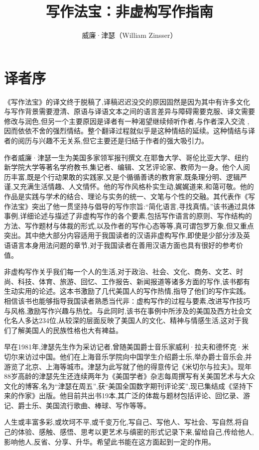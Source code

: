 \documentclass{ctexbook}
\title{写作法宝：非虚构写作指南}
\author{威廉·津瑟（William Zinsser）}
\date{}
\begin{document}
\maketitle


\chapter*{译者序}
《写作法宝》的译文终于脱稿了,译稿迟迟没交的原因固然是因为其中有许多文化与写作背景需要澄清、原语与译语文本之间的语言差异与障碍需要克服、译文需要修改与润色,但另一个主要原因是译者有一种渴望继续倾听作者,与作者深入交流 ,因而依依不舍的强烈情结。整个翻译过程就似乎是这种情结的延续。这种情结与译者的阅历与兴趣不无关系,但它主要还是归结于作者的强大吸引力。

作者威廉·津瑟一生为美国多家领军报刊撰文,在耶鲁大学、哥伦比亚大学、纽约新学院大学等著名学府教书,集记者、编辑、文艺评论家、教师为一身。他个人阅历丰富,既是个行动果敢的实践家,又是个循循善诱的教育家,既条理分明、逻辑严谨,又充满生活情趣、人文情怀。他的写作风格朴实生动,娓娓道来,和蔼可敬。他的作品是实践与学术的结合、理论与实务的统一、文笔与个性的交融。其代表作《写作法宝》突出了他一贯坚持与倡导的写作宗旨:“简化语言,寻找真情。”该书通过具体事例,详细论述与描述了非虚构写作的各个要素,包括写作语言的原则、写作结构的方法、写作题材与体裁的形式,以及作者的写作心态等等,真可谓包罗万象,但又重点突出。其中绝大部分内容适用于我国读者的汉语非虚构写作,即使是少部分涉及英语语言本身用法问题的章节,对于我国读者在善用汉语方面也具有很好的参考价值。

非虚构写作关乎我们每一个人的生活,对于政治、社会、文化、商务、文艺、时尚、科技、体育、旅游、回忆、工作报告、新闻报道等诸多方面的写作,该书都有生动实用的论述。这本书激励了几代美国人的写作热情,指导了他们的写作实践。相信该书也能够指导我国读者熟悉当代非∶虚构写作的过程与要素,改进写作技巧与风格,激励写作兴趣与热忱。与此同时,该书在事例中所涉及的美国及西方社会文化名人多达234位,从较深的层面反映了美国人的文化、精神与情感生活,这对于我们了解美国人的民族性格也大有裨益。

早在1981年,津瑟先生作为采访记者,曾随美国爵士音乐家威利·拉夫和德怀克·米切尔来访过中国。他们在上海音乐学院向中国学生介绍爵士乐,举办爵士音乐会,并游览了北京、上海等城市。津瑟为此写就了他的得意传记《米切尔与拉夫》。现年88岁高龄的津瑟先生还连续两年为《美国学者》杂志每周撰写有关美国艺术与大众文化的博客,名为“津瑟在周五”,获“美国全国数字期刊评论奖”,现已集结成《坚持下来的作家》出版。他目前共出书19本,其广泛的体裁与题材包括评论、回忆录、游记、爵士乐、美国流行歌曲、棒球、写作等等。

人生或丰富多彩,或坎坷不平,或千变万化,写自己、写他人、写社会、写自然,将自己的体验、感触、感悟、思考以更艺术与缜密的形式记录下来,留给自己,传给他人,影响他人,反省、分享、升华。希望此书能在这方面起到一定的作用。
\end{document}
